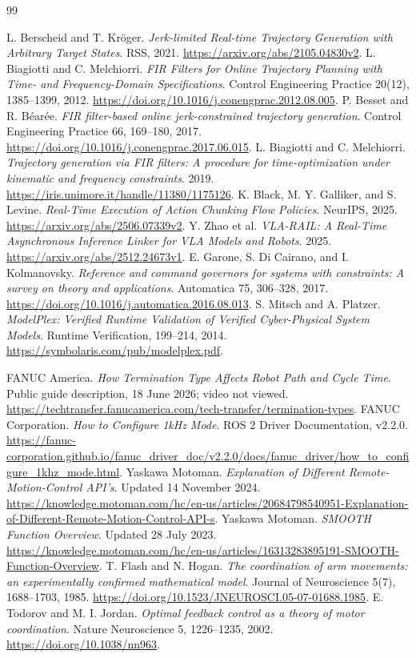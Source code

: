 \documentclass[11pt,letterpaper]{article}
\begin{document}
\newpage
\begin{thebibliography}{99}\small\raggedright
{} L. Berscheid and T. Kr\"oger.
\emph{Jerk-limited Real-time Trajectory Generation with Arbitrary Target States}.
RSS, 2021. \url{https://arxiv.org/abs/2105.04830v2}.
 L. Biagiotti and C. Melchiorri.
\emph{FIR Filters for Online Trajectory Planning with Time- and Frequency-Domain Specifications}. Control Engineering Practice 20(12), 1385--1399, 2012.
\url{https://doi.org/10.1016/j.conengprac.2012.08.005}.
 P. Besset and R. B\'ear\'ee.
\emph{FIR filter-based online jerk-constrained trajectory generation}. Control Engineering Practice 66, 169--180, 2017.
\url{https://doi.org/10.1016/j.conengprac.2017.06.015}.
 L. Biagiotti and C. Melchiorri.
\emph{Trajectory generation via FIR filters: A procedure for time-optimization under kinematic and frequency constraints}. 2019.
\url{https://iris.unimore.it/handle/11380/1175126}.
 K. Black, M. Y. Galliker, and S. Levine.
\emph{Real-Time Execution of Action Chunking Flow Policies}. NeurIPS, 2025.
\url{https://arxiv.org/abs/2506.07339v2}.
 Y. Zhao et al.
\emph{VLA-RAIL: A Real-Time Asynchronous Inference Linker for VLA Models and Robots}. 2025.
\url{https://arxiv.org/abs/2512.24673v1}.
 E. Garone, S. Di Cairano, and I. Kolmanovsky.
\emph{Reference and command governors for systems with constraints: A survey on theory and applications}.
Automatica 75, 306--328, 2017. \url{https://doi.org/10.1016/j.automatica.2016.08.013}.
 S. Mitsch and A. Platzer.
\emph{ModelPlex: Verified Runtime Validation of Verified Cyber-Physical System Models}.
Runtime Verification, 199--214, 2014.
\url{https://symbolaris.com/pub/modelplex.pdf}.

 FANUC America.
\emph{How Termination Type Affects Robot Path and Cycle Time}. Public guide description, 18 June 2026; video not viewed.
\url{https://techtransfer.fanucamerica.com/tech-transfer/termination-types}.
 FANUC Corporation.
\emph{How to Configure 1kHz Mode}. ROS 2 Driver Documentation, v2.2.0.
\url{https://fanuc-corporation.github.io/fanuc_driver_doc/v2.2.0/docs/fanuc_driver/how_to_configure_1khz_mode.html}.
 Yaskawa Motoman.
\emph{Explanation of Different Remote-Motion-Control API's}. Updated 14 November 2024.
\url{https://knowledge.motoman.com/hc/en-us/articles/20684798540951-Explanation-of-Different-Remote-Motion-Control-API-s}.
 Yaskawa Motoman.
\emph{SMOOTH Function Overview}. Updated 28 July 2023.
\url{https://knowledge.motoman.com/hc/en-us/articles/16313283895191-SMOOTH-Function-Overview}.
 T. Flash and N. Hogan.
\emph{The coordination of arm movements: an experimentally confirmed mathematical model}.
Journal of Neuroscience 5(7), 1688--1703, 1985.
\url{https://doi.org/10.1523/JNEUROSCI.05-07-01688.1985}.
 E. Todorov and M. I. Jordan.
\emph{Optimal feedback control as a theory of motor coordination}.
Nature Neuroscience 5, 1226--1235, 2002.
\url{https://doi.org/10.1038/nn963}.
\end{thebibliography}
\end{document}
